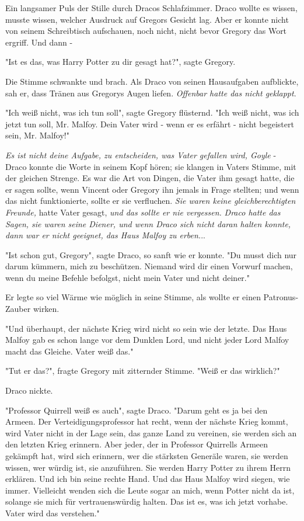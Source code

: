 {Ein langsamer Puls der Stille durch Dracos Schlafzimmer. Draco wollte es wissen, musste wissen, welcher Ausdruck auf Gregors Gesicht lag. Aber er konnte nicht von seinem Schreibtisch aufschauen, noch nicht, nicht bevor Gregory das Wort ergriff. Und dann -

"Ist es das, was Harry Potter zu dir gesagt hat?", sagte Gregory.

Die Stimme schwankte und brach. Als Draco von seinen Hausaufgaben aufblickte, sah er, dass Tränen aus Gregorys Augen liefen. \emph{Offenbar hatte das nicht geklappt}.

"Ich weiß nicht, was ich tun soll", sagte Gregory flüsternd. "Ich weiß nicht, was ich jetzt tun soll, Mr. Malfoy. Dein Vater wird - wenn er es erfährt - nicht begeistert sein, Mr. Malfoy!"

\emph{Es ist nicht deine Aufgabe, zu entscheiden, was Vater gefallen wird, Goyle} - Draco konnte die Worte in seinem Kopf hören; sie klangen in Vaters Stimme, mit der gleichen Strenge. Es war die Art von Dingen, die Vater ihm gesagt hatte, die er sagen sollte, wenn Vincent oder Gregory ihn jemals in Frage stellten; und wenn das nicht funktionierte, sollte er sie verfluchen. \emph{Sie waren keine gleichberechtigten Freunde,} hatte Vater gesagt, \emph{und das sollte er nie vergessen.} \emph{Draco hatte das Sagen, sie waren seine Diener, und wenn Draco sich nicht daran halten konnte, dann war er nicht geeignet, das Haus Malfoy zu erben.}..

"Ist schon gut, Gregory", sagte Draco, so sanft wie er konnte. "Du musst dich nur darum kümmern, mich zu beschützen. Niemand wird dir einen Vorwurf machen, wenn du meine Befehle befolgst, nicht mein Vater und nicht deiner."

Er legte so viel Wärme wie möglich in seine Stimme, als wollte er einen Patronus-Zauber wirken.

"Und überhaupt, der nächste Krieg wird nicht so sein wie der letzte. Das Haus Malfoy gab es schon lange vor dem Dunklen Lord, und nicht jeder Lord Malfoy macht das Gleiche. Vater weiß das."

"Tut er das?", fragte Gregory mit zitternder Stimme. "Weiß er das wirklich?"

Draco nickte.

"Professor Quirrell weiß es auch", sagte Draco. "Darum geht es ja bei den Armeen. Der Verteidigungsprofessor hat recht, wenn der nächste Krieg kommt, wird Vater nicht in der Lage sein, das ganze Land zu vereinen, sie werden sich an den letzten Krieg erinnern. Aber jeder, der in Professor Quirrells Armeen gekämpft hat, wird sich erinnern, wer die stärksten Generäle waren, sie werden wissen, wer würdig ist, sie anzuführen. Sie werden Harry Potter zu ihrem Herrn erklären. Und ich bin seine rechte Hand. Und das Haus Malfoy wird siegen, wie immer. Vielleicht wenden sich die Leute sogar an mich, wenn Potter nicht da ist, solange sie mich für vertrauenswürdig halten. Das ist es, was ich jetzt vorhabe. Vater wird das verstehen."

}
